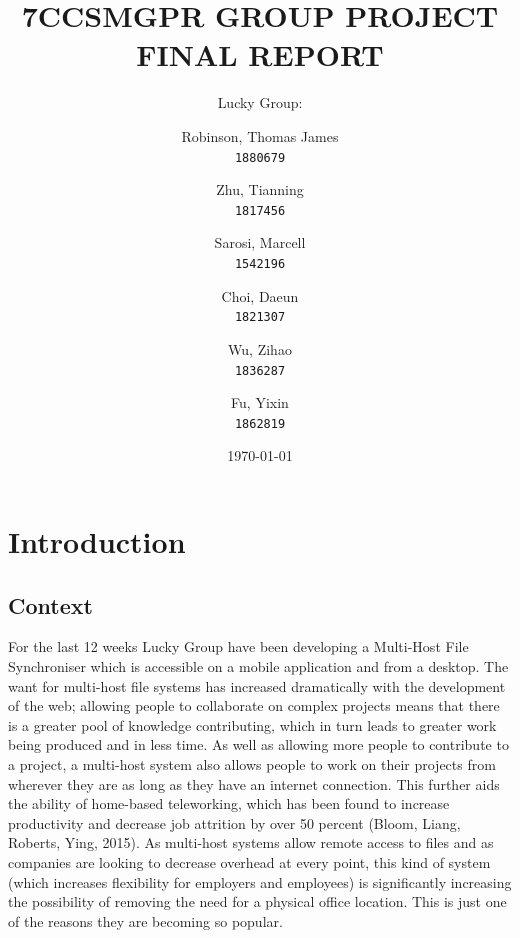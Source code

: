 \documentclass[11pt]{article}
\begin{document}
\title{7CCSMGPR GROUP PROJECT FINAL REPORT}
\author{
Lucky Group:\\
  \and
  Robinson, Thomas James\\
  \texttt{1880679}
  \and
  Zhu, Tianning \\
  \texttt{1817456}
  \and
   Sarosi, Marcell \\
  \texttt{1542196}
  \and
  Choi, Daeun \\
  \texttt{1821307}
  \and
  Wu, Zihao \\
  \texttt{1836287}
  \and
  Fu, Yixin \\
  \texttt{1862819}
}

\doublespacing
\date{\today}
\maketitle

\pagebreak


\onehalfspacing
\tableofcontents
\doublespacing

\pagebreak



\section{Introduction}

\subsection{Context}



For the last 12 weeks Lucky Group have been developing a Multi-Host File Synchroniser which is accessible on a mobile application and from a desktop. The want for multi-host file systems has increased dramatically with the development of the web; allowing people to collaborate on complex projects means that there is a greater pool of knowledge contributing, which in turn leads to greater work being produced and in less time. As well as allowing more people to contribute to a project, a multi-host system also allows people to work on their projects from wherever they are as long as they have an internet connection. This further aids the ability of home-based teleworking, which has been found to increase productivity and decrease job attrition by over 50 percent (Bloom, Liang, Roberts,  Ying, 2015). As multi-host systems allow remote access to files and as companies are looking to decrease overhead at every point, this kind of system (which increases flexibility for employers and employees) is significantly increasing the possibility of removing the need for a physical office location. This is just one of the reasons they are becoming so popular. 
\end{document}
